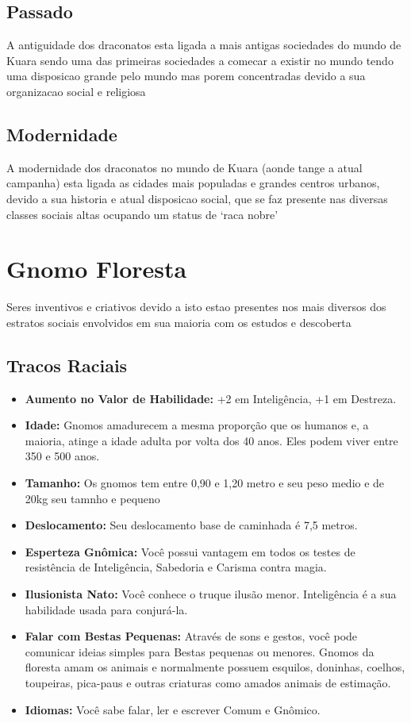 \documentclass{book}
\begin{document}
\section{Passado}
A antiguidade dos draconatos esta ligada a mais antigas sociedades do mundo de Kuara sendo 
uma das primeiras sociedades a comecar a existir no mundo tendo uma disposicao grande pelo 
mundo mas porem concentradas devido a sua organizacao social e religiosa
\section{Modernidade}
A modernidade dos draconatos no mundo de Kuara (aonde tange a atual campanha) esta ligada 
as cidades mais populadas e grandes centros urbanos, devido a sua historia e atual disposicao
social, que se faz presente nas diversas classes sociais altas ocupando um status de `raca 
nobre'

\chapter{Gnomo Floresta}
Seres inventivos e criativos devido a isto estao presentes nos mais diversos dos estratos 
sociais envolvidos em sua maioria com os estudos e descoberta
\section{Tracos Raciais}
\begin{itemize}
    \item \textbf{Aumento no Valor de Habilidade:} +2 em Inteligência, +1 em Destreza.
    \item \textbf{Idade:} Gnomos amadurecem a mesma proporção que os humanos e, a 
          maioria, atinge a idade adulta por volta dos 40 anos. Eles podem viver 
          entre 350 e 500 anos.
    \item \textbf{Tamanho:} Os gnomos tem entre 0,90 e 1,20 metro e seu peso medio e de
          20kg  seu tamnho e pequeno
    \item \textbf{Deslocamento:} Seu deslocamento base de caminhada é 7,5 metros.
     \item \textbf{Esperteza Gnômica:} Você possui vantagem em todos os testes de resistência 
          de Inteligência, Sabedoria e Carisma contra magia.
    \item \textbf{Ilusionista Nato:} Você conhece o truque ilusão menor. Inteligência é a sua 
          habilidade usada para conjurá-la.
    \item \textbf{Falar com Bestas Pequenas:} Através de sons e gestos, você pode comunicar  
          ideias simples para Bestas pequenas ou menores. Gnomos da floresta amam os
          animais e normalmente possuem esquilos, doninhas, coelhos, toupeiras, pica-paus 
          e outras criaturas como amados animais de estimação.
    \item \textbf{Idiomas:} Você sabe falar, ler e escrever Comum e Gnômico.
\end{itemize}
\end{document}
